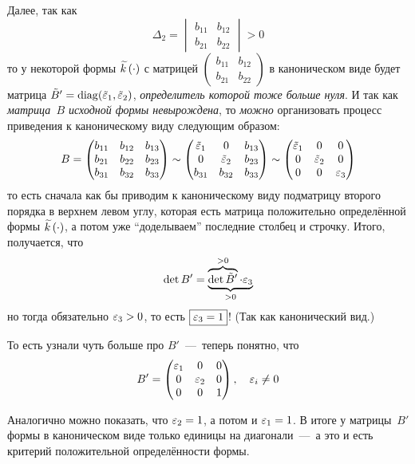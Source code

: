 \documentclass[a4paper,12pt]{article}
\begin{document}
\begin{example}
    Далее, так как
    \[
      \Delta_2 = \begin{vmatrix}
        b_{11} & b_{12}\\
        b_{21} & b_{22}
      \end{vmatrix} > 0
    \]
    то у некоторой формы $\widetilde{k\hphantom{\,}} (\cdot)$ с матрицей $\left(  %
      \begin{smallmatrix}
        b_{11} & b_{12}\\
        b_{21} & b_{22}
      \end{smallmatrix}
    \right)$ в каноническом виде будет матрица $\tilde B' \hm= \diag(\tilde \eps_1, \tilde \eps_2)$, \emph{определитель которой тоже больше нуля}.
    И так как \emph{матрица~$B$ исходной формы невырождена}, то \emph{можно} организовать процесс приведения к каноническому виду следующим образом:
    \[
      B = \begin{pmatrix}
        b_{11} & b_{12} & b_{13}\\
        b_{21} & b_{22} & b_{23}\\
        b_{31} & b_{32} & b_{33}
      \end{pmatrix} \sim \begin{pmatrix}
        \tilde {\varepsilon}_1 & 0             & b_{13}\\
        0             & \tilde {\varepsilon}_2 & b_{23}\\
        b_{31} & b_{32} & b_{33}
      \end{pmatrix} \sim \begin{pmatrix}
        \tilde {\varepsilon}_1 & 0             & 0\\
        0             & \tilde {\varepsilon}_2 & 0\\
        0             & 0             & \varepsilon_3
      \end{pmatrix}
    \]
    то есть сначала как бы приводим к каноническому виду подматрицу второго порядка в верхнем левом углу, которая есть матрица положительно определённой формы $\widetilde{k\hphantom{\,}} (\cdot)$, а потом уже ``доделываем'' последние столбец и строчку.
    Итого, получается, что
    \[
      \det B' = \underbrace{\overbrace{\det \tilde B'}^{> 0} \cdot \varepsilon_3}_{> 0}
    \]
    но тогда обязательно $\eps_3 \hm> 0$, то есть $\boxed{\eps_3 \hm= 1}$!
    (Так как канонический вид.)
    
    То есть узнали чуть больше про $B'$~---~теперь понятно, что
    \[
      B' = \begin{pmatrix}
        \varepsilon_1 & 0      & 0\\
        0      & \varepsilon_2 & 0\\
        0      & 0      & 1
      \end{pmatrix},\quad \varepsilon_i \not= 0
    \]
    
    Аналогично можно показать, что $\eps_2 \hm= 1$, а потом и $\eps_1 \hm= 1$.
    В итоге у матрицы~$B'$ формы в каноническом виде только единицы на диагонали~---~а это и есть критерий положительной определённости формы.
  \end{example}
  
\end{document}
